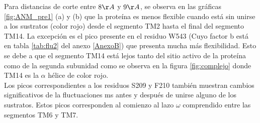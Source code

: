 Para distancias de corte entre $8\AA$ y $9\AA$, se observa en las gr\'{a}ficas \ref{fig:ANM_pre1} (a) y (b) que la prote\'{i}na  es menos flexible cuando est\'{a} sin unirse a los sustratos (color rojo) desde el segmento TM2 hasta el final del segmento TM14. La excepci\'{o}n es el pico presente en el residuo W543 (Cuyo factor b est\'{a} en tabla \ref{tab:flu2} del anexo \ref{AnexoB}) que presenta mucha m\'{a}s flexibilidad. Esto se debe a que el segmento TM14 est\'{a} lejos tanto del sitio activo de la prote\'{i}na como de la segunda subunidad como se observa en la figura \ref{fig:complejo} donde TM14 es la $\alpha$ h\'{e}lice de color rojo.\\

Los picos correspondientes a los residuos S209 y F210 tambi\'{e}n muestran cambios significativos de la fluctuaciones ms antes y despu\'{e}s de unirse alguno de los sustratos. Estos picos corresponden al comienzo al lazo $\omega$ comprendido entre las segmentos TM6 y TM7.\\

